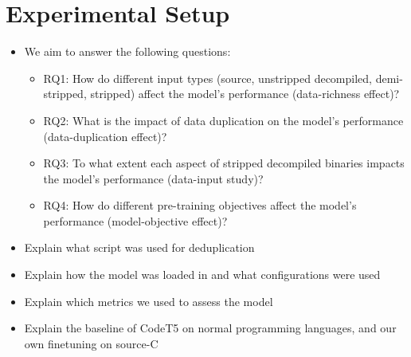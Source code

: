 \chapter{Experimental Setup}
\label{ExperimentalSetup}
\begin{itemize}
    \item We aim to answer the following questions:
    \begin{itemize}
        \item RQ1: How do different input types (source, unstripped decompiled, demi-stripped, stripped) affect the model's performance (data-richness effect)?
        \item RQ2: What is the impact of data duplication on the model's performance (data-duplication effect)?
        \item RQ3: To what extent each aspect of stripped decompiled binaries impacts the model's performance (data-input study)?
        \item RQ4: How do different pre-training objectives affect the model's performance (model-objective effect)?
    \end{itemize}
    \item Explain what script was used for deduplication
    \item Explain how the model was loaded in and what configurations were used
    \item Explain which metrics we used to assess the model
    \item Explain the baseline of CodeT5 on normal programming languages, and our own finetuning on source-C
\end{itemize}